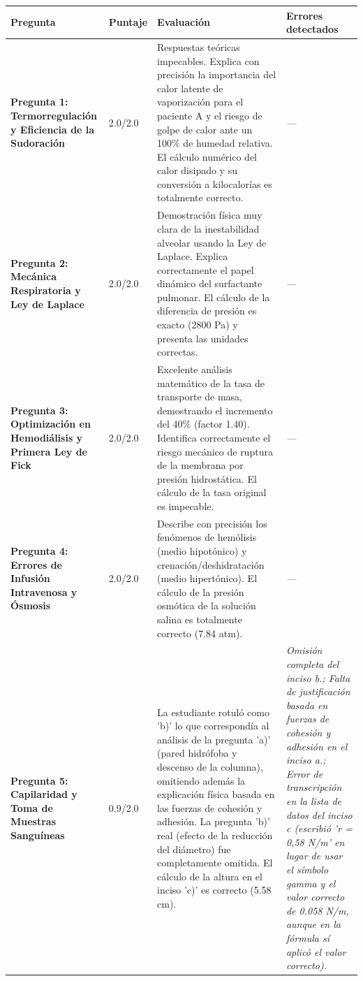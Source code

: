 \documentclass[11pt,a4paper]{article}
\begin{document}
\begin{longtable}{>{\bfseries}p{2.8cm} p{1.6cm} p{7.0cm} p{2.8cm}}
  \toprule
  \textbf{Pregunta} & \textbf{Puntaje} & \textbf{Evaluación} & \textbf{Errores detectados} \\
  \midrule
  \endhead
  \bottomrule
  \endfoot
    \textbf{Pregunta 1: Termorregulación y Eficiencia de la Sudoración} & 2.0/2.0 & Respuestas teóricas impecables. Explica con precisión la importancia del calor latente de vaporización para el paciente A y el riesgo de golpe de calor ante un 100\% de humedad relativa. El cálculo numérico del calor disipado y su conversión a kilocalorías es totalmente correcto. & \textit{---} \\
    \midrule
    \textbf{Pregunta 2: Mecánica Respiratoria y Ley de Laplace} & 2.0/2.0 & Demostración física muy clara de la inestabilidad alveolar usando la Ley de Laplace. Explica correctamente el papel dinámico del surfactante pulmonar. El cálculo de la diferencia de presión es exacto (2800 Pa) y presenta las unidades correctas. & \textit{---} \\
    \midrule
    \textbf{Pregunta 3: Optimización en Hemodiálisis y Primera Ley de Fick} & 2.0/2.0 & Excelente análisis matemático de la tasa de transporte de masa, demostrando el incremento del 40\% (factor 1.40). Identifica correctamente el riesgo mecánico de ruptura de la membrana por presión hidrostática. El cálculo de la tasa original es impecable. & \textit{---} \\
    \midrule
    \textbf{Pregunta 4: Errores de Infusión Intravenosa y Ósmosis} & 2.0/2.0 & Describe con precisión los fenómenos de hemólisis (medio hipotónico) y crenación/deshidratación (medio hipertónico). El cálculo de la presión osmótica de la solución salina es totalmente correcto (7.84 atm). & \textit{---} \\
    \midrule
    \textbf{Pregunta 5: Capilaridad y Toma de Muestras Sanguíneas} & 0.9/2.0 & La estudiante rotuló como 'b)' lo que correspondía al análisis de la pregunta 'a)' (pared hidrófoba y descenso de la columna), omitiendo además la explicación física basada en las fuerzas de cohesión y adhesión. La pregunta 'b)' real (efecto de la reducción del diámetro) fue completamente omitida. El cálculo de la altura en el inciso 'c)' es correcto (5.58 cm). & \textit{Omisión completa del inciso b.; Falta de justificación basada en fuerzas de cohesión y adhesión en el inciso a.; Error de transcripción en la lista de datos del inciso c (escribió 'r = 0,58 N/m' en lugar de usar el símbolo gamma y el valor correcto de 0.058 N/m, aunque en la fórmula sí aplicó el valor correcto).} \\
    \midrule
\end{longtable}
\end{document}
